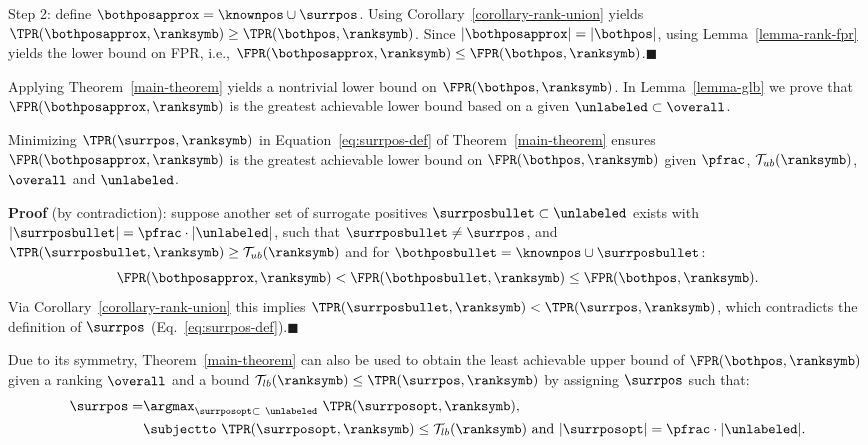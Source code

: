 \begin{theorem}
Step 2: define $\bothposapprox = \knownpos \cup \surrpos$. Using Corollary~\ref{corollary-rank-union} yields $\TPR(\bothposapprox, \ranksymb) \geq \TPR(\bothpos, \ranksymb)$. Since $|\bothposapprox|=|\bothpos|$, using Lemma~\ref*{lemma-rank-fpr} yields the lower bound on FPR, i.e., $\FPR(\bothposapprox, \ranksymb) \leq \FPR(\bothpos, \ranksymb)$.\hfill$\blacksquare$
\end{theorem}

Applying Theorem~\ref{main-theorem} yields a nontrivial lower bound on $\FPR(\bothpos,\ranksymb)$. In Lemma~\ref*{lemma-glb} we prove that $\FPR(\bothposapprox,\ranksymb)$ is the greatest achievable lower bound based on a given $\unlabeled\subset\overall$.

\begin{lemma} \label{lemma-glb}
Minimizing $\TPR(\surrpos, \ranksymb)$ in Equation~\eqref{eq:surrpos-def} of Theorem~\ref{main-theorem} ensures $\FPR(\bothposapprox, \ranksymb)$ is the greatest achievable lower bound on $\FPR(\bothpos, \ranksymb)$ given $\pfrac$, $\mathcal{T}_{ub}(\ranksymb)$, $\overall$ and $\unlabeled$. 

\textbf{Proof} (by contradiction): suppose another set of surrogate positives $\surrposbullet \subset \unlabeled$ exists with $|\surrposbullet|=\pfrac\cdot|\unlabeled|$, such that $\surrposbullet\neq\surrpos$, and $\TPR(\surrposbullet,\ranksymb) \geq \mathcal{T}_{ub}(\ranksymb)$ and for $\bothposbullet = \knownpos\cup\surrposbullet$: 
\begin{equation*}
\FPR(\bothposapprox,\ranksymb) < \FPR(\bothposbullet,\ranksymb) \leq \FPR(\bothpos,\ranksymb).
\end{equation*}
Via Corollary~\ref{corollary-rank-union} this implies $\TPR(\surrposbullet,\ranksymb) < \TPR(\surrpos,\ranksymb)$, which contradicts the definition of $\surrpos$ (Eq.~\eqref{eq:surrpos-def}).\hfill$\blacksquare$
\end{lemma}

Due to its symmetry, Theorem~\ref{main-theorem} can also be used to obtain the least achievable upper bound of $\FPR(\bothpos, \ranksymb)$ given a ranking $\overall$ and a bound $\mathcal{T}_{lb}(\ranksymb) \leq \TPR(\surrpos, \ranksymb)$ by assigning $\surrpos$ such that:
\begin{align}
\surrpos = &\argmax_{\surrposopt\subset\ \unlabeled}\ \TPR(\surrposopt, \ranksymb), \label{eq:surrpos-def-ub} \\
&\subjectto\ \TPR(\surrposopt,\ranksymb) \leq \mathcal{T}_{lb}(\ranksymb) \text{ and } |\surrposopt|=\pfrac\cdot|\unlabeled| \nonumber. 
\end{align}
